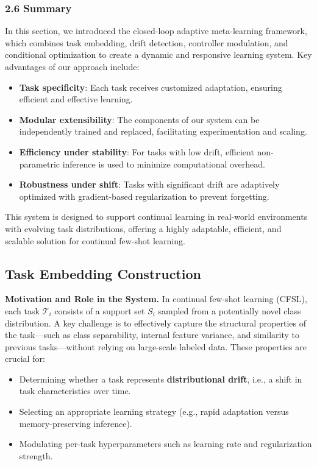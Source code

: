 \documentclass[conference]{IEEEtran}
\begin{document}
\subsubsection*{2.6 Summary}

In this section, we introduced the closed-loop adaptive meta-learning framework, which combines task embedding, drift detection, controller modulation, and conditional optimization to create a dynamic and responsive learning system. Key advantages of our approach include:

\begin{itemize}
    \item \textbf{Task specificity}: Each task receives customized adaptation, ensuring efficient and effective learning.
    \item \textbf{Modular extensibility}: The components of our system can be independently trained and replaced, facilitating experimentation and scaling.
    \item \textbf{Efficiency under stability}: For tasks with low drift, efficient non-parametric inference is used to minimize computational overhead.
    \item \textbf{Robustness under shift}: Tasks with significant drift are adaptively optimized with gradient-based regularization to prevent forgetting.
\end{itemize}

This system is designed to support continual learning in real-world environments with evolving task distributions, offering a highly adaptable, efficient, and scalable solution for continual few-shot learning.




\subsection{Task Embedding Construction}

\textbf{Motivation and Role in the System.}  
In continual few-shot learning (CFSL), each task $\mathcal{T}_i$ consists of a support set $S_i$ sampled from a potentially novel class distribution. A key challenge is to effectively capture the structural properties of the task—such as class separability, internal feature variance, and similarity to previous tasks—without relying on large-scale labeled data. These properties are crucial for:

\begin{itemize}
    \item Determining whether a task represents \textbf{distributional drift}, i.e., a shift in task characteristics over time.
    \item Selecting an appropriate learning strategy (e.g., rapid adaptation versus memory-preserving inference).
    \item Modulating per-task hyperparameters such as learning rate and regularization strength.
\end{itemize}
\end{document}
